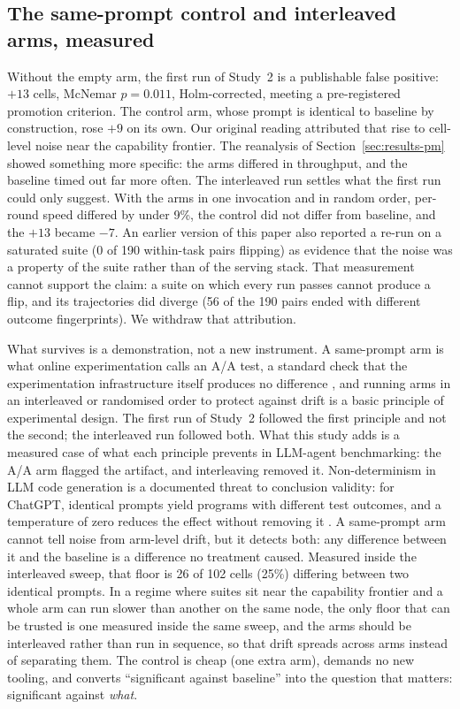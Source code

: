 \documentclass[smallcondensed,natbib]{svjour3}
\begin{document}
\subsection{The same-prompt control and interleaved arms, measured}\label{sec:disc-control}

Without the empty arm, the first run of Study~2 is a publishable false
positive: $+13$ cells, McNemar $p=0.011$, Holm-corrected, meeting a
pre-registered promotion criterion. The control arm, whose prompt is
identical to baseline by construction, rose $+9$ on its own. Our
original reading attributed that rise to cell-level noise near the
capability frontier. The reanalysis of Section~\ref{sec:results-pm}
showed something more specific: the arms differed in throughput, and
the baseline timed out far more often. The interleaved run settles
what the first run could only suggest. With the arms in one invocation
and in random order, per-round speed differed by under 9\%, the
control did not differ from baseline, and the $+13$ became $-7$.
An earlier version of this paper also reported a re-run on a saturated
suite (0 of 190 within-task pairs flipping) as evidence that the noise
was a property of the suite rather than of the serving stack. That
measurement cannot support the claim: a suite on which every run
passes cannot produce a flip, and its trajectories did diverge (56 of
the 190 pairs ended with different outcome fingerprints). We withdraw
that attribution.

What survives is a demonstration, not a new instrument. A same-prompt
arm is what online experimentation calls an A/A test, a standard check
that the experimentation infrastructure itself produces no difference
\citep{kohavi2020trustworthy}, and running arms in an interleaved or
randomised order to protect against drift is a basic principle of
experimental design. The first run of Study~2 followed the first
principle and not the second; the interleaved run followed both. What
this study adds is a measured case of what each principle prevents in
LLM-agent benchmarking: the A/A arm flagged the artifact, and
interleaving removed it. Non-determinism in LLM code
generation is a documented threat to conclusion validity: for
ChatGPT, identical prompts yield programs with different test
outcomes, and a temperature of zero reduces the effect without
removing it \citep{ouyang2025nondeterminism}. A same-prompt arm cannot tell noise
from arm-level drift, but it detects both: any difference between it
and the baseline is a difference no treatment caused. Measured inside
the interleaved sweep, that floor is 26 of 102 cells (25\%) differing
between two identical prompts. In a regime where suites sit near the
capability frontier and a whole arm can run slower than another on the
same node, the only floor that can be trusted is one measured inside
the same sweep, and the arms should be interleaved rather than run in
sequence, so that drift spreads across arms instead of separating
them. The control is cheap (one extra
arm), demands no new tooling, and converts ``significant against
baseline'' into the question that matters: significant against
\emph{what}.
\end{document}
